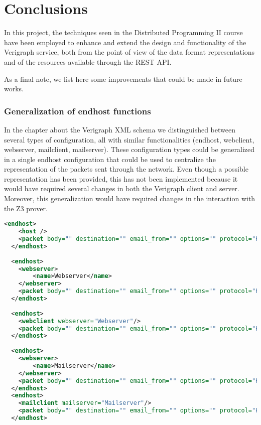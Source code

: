\section {Conclusions}

In this project, the techniques seen in the Distributed Programming II course have been employed to enhance and extend the design and functionality of the Verigraph service, both from the point of view of the data format representations and of the resources available through the REST API.

As a final note, we list here some improvements that could be made in future works.

\subsubsection* {Generalization of endhost functions}

In the chapter about the Verigraph XML schema we distinguished between several types of configuration, all with similar functionalities (endhost, webclient, webserver, mailclient, mailserver).  These configuration types could be generalized in a single endhost configuration that could be used to centralize the representation of the packets sent through the network. Even though a possible representation has been provided, this has not been implemented because it would have required several changes in both the Verigraph client and server. Moreover, this generalization would have required changes in the interaction with the Z3 prover.

\begin{lstlisting}[language=XML, caption=Examples of generalized endhost configurations]
  <endhost>
  	<host />
  	<packet body="" destination="" email_from="" options="" protocol="HTTP_REQUEST" sequence="0" url=""/>
  </endhost>
  
  <endhost>
  	<webserver> 
  		<name>Webserver</name>
  	</webserver>
  	<packet body="" destination="" email_from="" options="" protocol="HTTP_REQUEST" sequence="0" url=""/>
  </endhost>
  
  <endhost>
  	<webclient webserver="Webserver"/>
  	<packet body="" destination="" email_from="" options="" protocol="HTTP_REQUEST" sequence="0" url=""/>
  </endhost>
  
  <endhost>
  	<webserver> 
  		<name>Mailserver</name>
  	</webserver>
  	<packet body="" destination="" email_from="" options="" protocol="HTTP_REQUEST" sequence="0" url=""/>
  </endhost>
  <endhost>
  	<mailclient mailserver="Mailserver"/>
  	<packet body="" destination="" email_from="" options="" protocol="HTTP_REQUEST" sequence="0" url=""/>
  </endhost>
\end{lstlisting}

